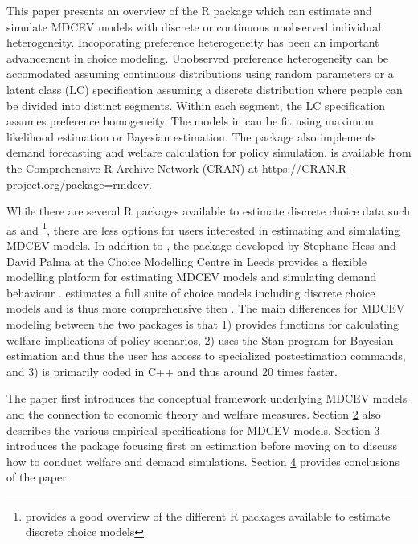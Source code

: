This paper presents an overview of the R package  which can
estimate and simulate MDCEV models with discrete or continuous
unobserved individual heterogeneity. Incoporating preference
heterogeneity has been an important advancement in choice modeling.
Unobserved preference heterogeneity can be accomodated assuming
continuous distributions using random parameters or a latent class (LC)
specification assuming a discrete distribution where people can be
divided into distinct segments. Within each segment, the LC
specification assumes preference homogeneity. The models in 
can be fit using maximum likelihood estimation or Bayesian estimation.
The  package also implements demand forecasting and welfare
calculation for policy simulation.  is available from the
Comprehensive R Archive Network (CRAN) at
\url{https://CRAN.R-project.org/package=rmdcev}.

While there are several R packages available to estimate discrete choice
data such as  \citep{mlogit2019} and 
\citep{sarriasmultinomial2017}\footnote{\citet{sarriasmultinomial2017}
  provides a good overview of the different R packages available to
  estimate discrete choice models}, there are less options for users
interested in estimating and simulating MDCEV models. In addition to
, the
\href{http://www.apollochoicemodelling.com/}{} package
developed by Stephane Hess and David Palma at the Choice Modelling
Centre in Leeds provides a flexible modelling platform for estimating
MDCEV models and simulating demand behaviour \citep{hessapollo2019}.
 estimates a full suite of choice models including discrete
choice models and is thus more comprehensive then . The main
differences for MDCEV modeling between the two packages is that
 1) provides functions for calculating welfare implications
of policy scenarios, 2) uses the Stan program \citep{carpenterstan2017}
for Bayesian estimation and thus the user has access to specialized
postestimation commands, and 3) is primarily coded in C++ and thus
around 20 times faster.

The paper first introduces the conceptual framework underlying MDCEV
models and the connection to economic theory and welfare measures.
Section \protect\hyperlink{models}{2} also describes the various
empirical specifications for MDCEV models. Section
\protect\hyperlink{rmdcev}{3} introduces the  package
focusing first on estimation before moving on to discuss how to conduct
welfare and demand simulations. Section
\protect\hyperlink{conclusions}{4} provides conclusions of the paper.

